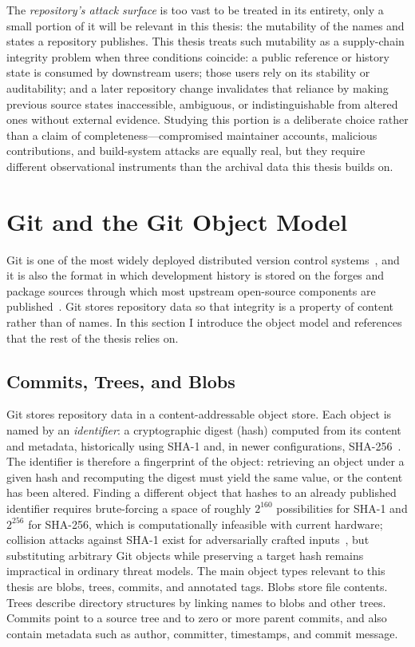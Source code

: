 The \emph{repository's attack surface} is too vast to be treated in its entirety, only a small portion of it will be relevant in this thesis: the mutability of the names and states a repository publishes.
\label{subsec:bg-trust-dependencies}%
This thesis treats such mutability as a supply-chain integrity problem when three conditions coincide: a public reference or history state is consumed by downstream users; those users rely on its stability or auditability; and a later repository change invalidates that reliance by making previous source states inaccessible, ambiguous, or indistinguishable from altered ones without external evidence.
Studying this portion is a deliberate choice rather than a claim of completeness---compromised maintainer accounts, malicious contributions, and build-system attacks are equally real, but they require different observational instruments than the archival data this thesis builds on.

\section{Git and the Git Object Model}
\label{sec:bg-git-model}

Git is one of the most widely deployed distributed version control systems~\cite{DBLP:journals/access/GrilliS24, ProGit2014, DBLP:conf/ndss/HoltgraveFFHBKF25}, and it is also the format in which development history is stored on the forges and package sources through which most upstream open-source components are published~\cite{DBLP:conf/msr/PietriSZ20}.
Git stores repository data so that integrity is a property of content rather than of names.
In this section I introduce the object model and references that the rest of the thesis relies on.

\subsection{Commits, Trees, and Blobs}
\label{subsec:bg-commits-trees-blobs}

Git stores repository data in a content-addressable object store.
Each object is named by an \emph{identifier}: a cryptographic digest (hash) computed from its content and metadata, historically using SHA-1 and, in newer configurations, SHA-256~\cite{ProGit2014}.
The identifier is therefore a fingerprint of the object: retrieving an object under a given hash and recomputing the digest must yield the same value, or the content has been altered.
Finding a different object that hashes to an already published identifier requires brute-forcing a space of roughly $2^{160}$ possibilities for SHA-1 and $2^{256}$ for SHA-256, which is computationally infeasible with current hardware; collision attacks against SHA-1 exist for adversarially crafted inputs~\cite{stevens2017shattered}, but substituting arbitrary Git objects while preserving a target hash remains impractical in ordinary threat models.
The main object types relevant to this thesis are blobs, trees, commits, and annotated tags.
Blobs store file contents.
Trees describe directory structures by linking names to blobs and other trees.
Commits point to a source tree and to zero or more parent commits, and also contain metadata such as author, committer, timestamps, and commit message.


